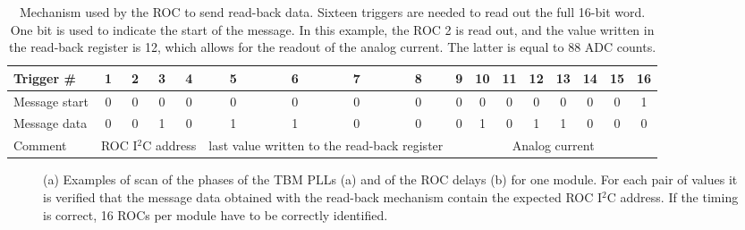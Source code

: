 \begin{table}[!htb]
  \caption{Mechanism used by the ROC to send read-back data. Sixteen triggers are needed to read out the full 16-bit word. One bit is used to indicate the start of the message.
  In this example, the ROC 2 is read out, and the value written in the read-back register is 12, which allows for the readout of the analog current. The latter is equal to 88 ADC counts.}
  \centering
  \begin{tabular}{|l|*{16}{c|}}
    \hline
    Trigger \#        & 1 & 2 & 3 & 4 & 5 & 6 & 7 & 8 & 9 & 10 & 11 & 12 & 13 & 14 & 15 & 16\\
    \hline
    Message start & 0 & 0 & 0 & 0 & 0 & 0 & 0 & 0 & 0 & 0   & 0  & 0   & 0   & 0   & 0   & 1\\
    \hline
    Message data & 0 & 0 & 1 & 0 & 1 & 1 & 0 & 0 & 0 & 1   & 0  & 1   & 1   & 0   & 0   & 0\\
    \hline
    Comment        & \multicolumn{4}{p{2cm}|}{\footnotesize ROC I$^2$C address} & \multicolumn{4}{p{2cm}|}{\footnotesize last value written to the read-back register} & \multicolumn{8}{p{4cm}|}{\footnotesize Analog current}\\

    \hline    
  \end{tabular}
  \label{tab:ReadBack}
\end{table}

\begin{figure}[!htb]
 \begin{center}
 \end{center}
 \caption{(a) Examples of scan of the phases of the TBM PLLs (a) and of the ROC delays (b) for one module. For each pair of values it is verified that the message data obtained with the read-back mechanism contain the expected ROC I$^2$C address. If the timing is correct, 16 ROCs per module have to be correctly identified.}
 \label{fig:TBMROCdelaysRB}
\end{figure} 

